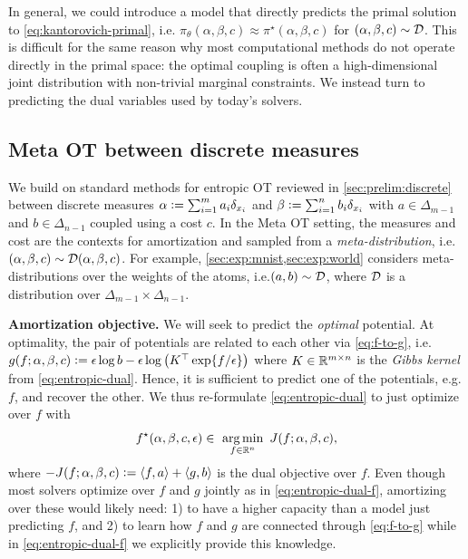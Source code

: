 \documentclass{article}
\newcommand{\eg}{e.g.\xspace}
\newcommand{\ie}{i.e.\xspace}
\newcommand{\defeq}{\vcentcolon=}
\begin{document}
In general, we could introduce a model that directly predicts
the primal solution to \cref{eq:kantorovich-primal}, \ie
$\pi_\theta(\alpha, \beta, c)\approx \pi^\star(\alpha, \beta, c)$
for $(\alpha, \beta, c)\sim {\mathcal{D}}$.
This is difficult for the same reason why most computational methods
do not operate directly in the primal space: the optimal coupling
is often a high-dimensional joint distribution with
non-trivial marginal constraints.
We instead turn to predicting the dual variables used by today's solvers.

\subsection{Meta OT between discrete measures}
\label{sec:meta-ot:discrete}

We build on standard methods for entropic OT
reviewed in \cref{sec:prelim:discrete} between discrete measures
$\alpha \defeq \sum_{i=1}^m a_i \delta_{x_i}$ and $\beta \defeq \sum_{i=1}^n b_i \delta_{x_i}$
with $a \in \Delta_{m-1}$ and $b\in \Delta_{n-1}$
coupled using a cost $c$.
In the Meta OT setting, the measures and cost are the contexts for
amortization and sampled from a
\emph{meta-distribution}, \ie $(\alpha,\beta,c)\sim{\mathcal{D}}(\alpha,\beta,c)$.
For example, \cref{sec:exp:mnist,sec:exp:world} considers meta-distributions
over the weights of the atoms, \ie $(a,b)\sim{\mathcal{D}}$, where
${\mathcal{D}}$ is a distribution over $\Delta_{m-1} \times \Delta_{n-1}$.

\textbf{Amortization objective.}
We will seek to predict the \emph{optimal} potential.
At optimality, the pair of potentials are related to each
other via \cref{eq:f-to-g}, \ie
$g(f; \alpha, \beta, c) \defeq \epsilon \log b - \epsilon\log\left(K^\top \exp\{f/\epsilon\}\right)$
where $K\in\mathbb{R}^{m\times n}$ is the \emph{Gibbs kernel}
from \cref{eq:entropic-dual}.
Hence, it is sufficient to predict one of the
potentials, \eg $f$, and recover the other.
We thus re-formulate \cref{eq:entropic-dual}
to just optimize over $f$ with
\begin{equation}
  f^\star(\alpha, \beta, c, \epsilon)\in\ \operatorname*{arg\,min}_{f\in\mathbb{R}^n}\ J(f; \alpha, \beta, c),
  \label{eq:entropic-dual-f}
\end{equation}
where $-J(f; \alpha, \beta, c)\defeq \langle f, a\rangle + \langle g, b \rangle$
is the dual objective over $f$.
Even though most solvers optimize over $f$ and $g$ jointly
as in \cref{eq:entropic-dual-f}, amortizing over these would likely need:
1) to have a higher capacity than a model just predicting $f$, and
2) to learn how $f$ and $g$ are connected through \cref{eq:f-to-g} while
in \cref{eq:entropic-dual-f} we explicitly provide this knowledge.
\end{document}
